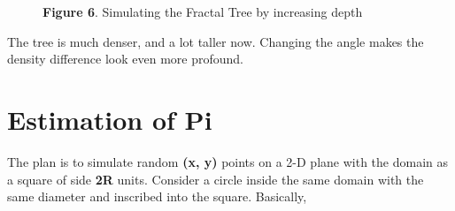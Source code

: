 \documentclass{resonance}
\begin{document}
	\begin{figure}[h!]
		
		\vspace{10pt}
		\hspace{5pt}\scriptsize{\textbf{Figure 6}. \normalfont Simulating the Fractal Tree by increasing depth}
	\end{figure}
	
	\pagebreak
	
	The tree is much denser, and a lot taller now. Changing the angle makes the density difference look even more profound.
	
	\section{Estimation of Pi}
	
	The plan is to simulate random \textbf{(x, y)} points on a 2-D plane with the domain as a square of side \textbf{2R} units. Consider a circle inside the same domain with the same diameter and inscribed into the square. Basically,
	
\end{document}
